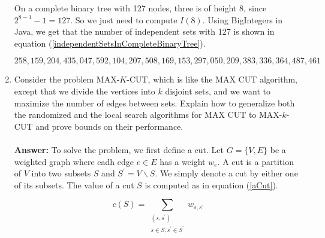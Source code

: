 \documentclass[tikz, 12pt]{scrartcl}
\begin{document}
\begin{enumerate}
On a complete binary tree with 127 nodes, three is of height 8, since $2^{8 - 1} - 1 = 127$. So we just need to compute $I(8)$. Using BigIntegers in Java, we get that the number of independent sets with 127 is shown in equation (\ref{independentSetsInCompleteBinaryTree}).

\begin{equation}\label{independentSetsInCompleteBinaryTree}
258,159,204,435,047,592,104,207,508,169,153,297,050,209,383,336,364,487,461
\end{equation}

	
	\item Consider the problem MAX-$K$-CUT, which is like the MAX CUT algorithm, except that we divide the vertices into $k$ disjoint sets, and we want to maximize the number of edges between sets. Explain how to generalize both the randomized and the local search algorithms for MAX CUT to MAX-$k$-CUT and prove bounds on their performance.\\
\\
\textbf{Answer:} To solve the problem, we first define a cut. Let $G = \{V, E\}$ be a weighted graph where eadh edge $e \in E$ has a weight $w_e$. A cut is a partition of $V$ into two subsets $S$ and $S^{\prime} = V \backslash S$. We simply denote a cut by either one of its subsets. The value of a cut $S$ is computed as in equation (\ref{aCut}).

\begin{equation}\label{aCut}
c(S) = \sum_{\begin{array}{c}(s,s^{\prime})\\ s\in S, s^{\prime} \in S^{\prime} \end{array} }w_{s,s^{\prime}}
\end{equation}


\end{enumerate}
\end{document}

